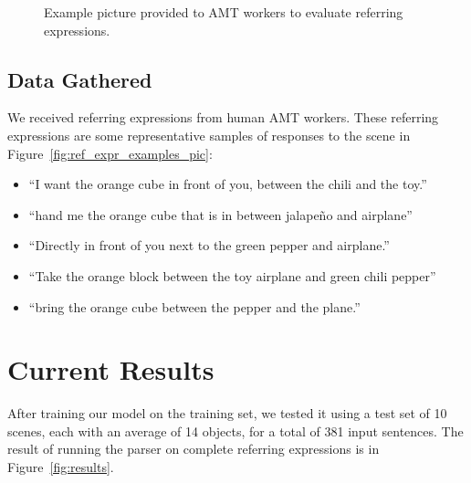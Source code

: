 \documentclass[conference]{IEEEtran}
\numberwithin{equation}{section}
\begin{document}
\begin{figure}[!h]
  \centering
  \caption{Example picture provided to AMT workers to evaluate referring expressions.}
  \label{fig:ref_expr_eval_pic}
\end{figure}

\subsection{Data Gathered}

We received referring expressions from human AMT workers. These referring expressions are some representative samples of responses to the scene in Figure~\ref{fig:ref_expr_examples_pic}:

\begin{itemize}[topsep=0pt,itemsep=-1ex,partopsep=1ex,parsep=1ex]
	\item ``I want the orange cube in front of you, between the chili and the toy.''
	\item ``hand me the orange cube that is in between jalape\~{n}o and airplane''
	\item ``Directly in front of you next to the green pepper and airplane.''
	\item ``Take the orange block between the toy airplane and green chili pepper''
	\item ``bring the orange cube between the pepper and the plane.''
\end{itemize}

\section{Current Results}

After training our model on the training set, we tested it using a test set of 10 scenes, each with an average of 14 objects, for a total of 381 input sentences. The result of running the parser on complete referring expressions is in Figure~\ref{fig:results}.
\end{document}
